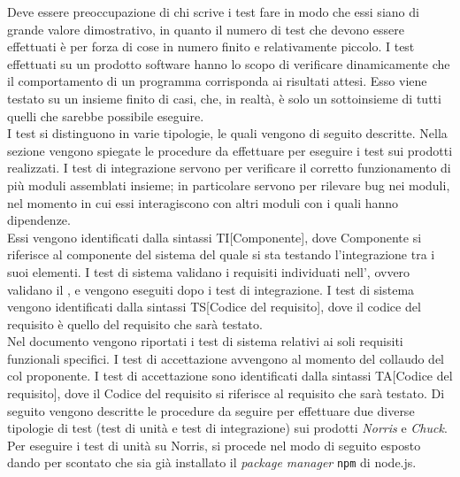 				Deve essere preoccupazione di chi scrive i test fare in modo che essi siano di grande valore dimostrativo, in quanto il numero di test che devono essere effettuati è per forza di cose in numero finito e relativamente piccolo.
		I test effettuati su un prodotto software hanno lo scopo di verificare dinamicamente che il comportamento di un programma corrisponda ai risultati attesi. Esso viene testato su un insieme finito di casi, che, in realtà, è solo un sottoinsieme di tutti quelli che sarebbe possibile eseguire.\\
		I test si distinguono in varie tipologie, le quali vengono di seguito descritte. Nella sezione  vengono spiegate le procedure da effettuare per eseguire i test sui prodotti realizzati.
				I test di integrazione servono per verificare il corretto funzionamento di più moduli assemblati insieme; in particolare servono per rilevare bug nei moduli, nel momento in cui essi interagiscono con altri moduli con i quali hanno dipendenze.\\
				Essi vengono identificati dalla sintassi TI[Componente], dove Componente si riferisce al componente del sistema del quale si sta testando l'integrazione tra i suoi elementi.
				I test di sistema validano i requisiti individuati nell', ovvero validano il  , e vengono eseguiti dopo i test di integrazione.
				I test di sistema vengono identificati dalla sintassi TS[Codice del requisito], dove il codice del requisito è quello del requisito che sarà testato.\\
				Nel documento  vengono riportati i test di sistema relativi ai soli requisiti funzionali specifici.
				I test di accettazione avvengono al momento del collaudo del  col proponente.
				I test di accettazione sono identificati dalla sintassi TA[Codice del requisito], dove il Codice del requisito si riferisce al requisito che sarà testato.
			 \label{sec:procedure}
			Di seguito vengono descritte le procedure da seguire per effettuare due diverse tipologie di test (test di unità e test di integrazione) sui prodotti \textit{Norris} e \textit{Chuck}.
						Per eseguire i test di unità su Norris, si procede nel modo di seguito esposto dando per scontato che sia già installato il \textit{package manager} \texttt{npm} di node.js.
